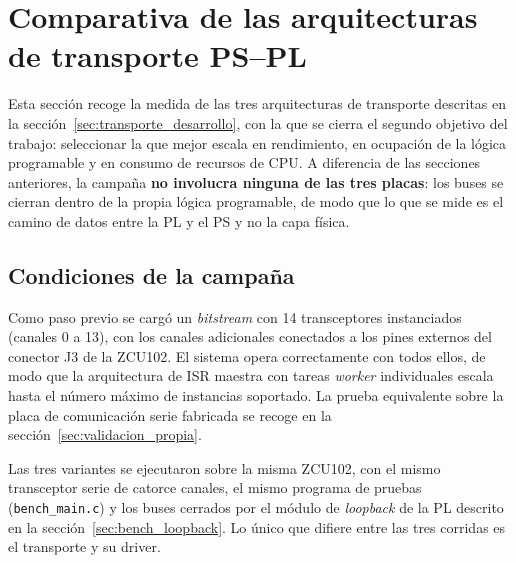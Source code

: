 
\section{Comparativa de las arquitecturas de transporte PS--PL} \label{sec:resultados_benchmark}

Esta sección recoge la medida de las tres arquitecturas de transporte descritas en la
sección~\ref{sec:transporte_desarrollo}, con la que se cierra el segundo objetivo del trabajo:
seleccionar la que mejor escala en rendimiento, en ocupación de la lógica programable y en consumo
de recursos de CPU. A diferencia de las secciones anteriores, la campaña \textbf{no involucra
ninguna de las tres placas}: los buses se cierran dentro de la propia lógica programable, de modo
que lo que se mide es el camino de datos entre la PL y el PS y no la capa física.

\subsection{Condiciones de la campaña}

Como paso previo se cargó un \textit{bitstream} con 14 transceptores instanciados (canales 0 a 13),
con los canales adicionales conectados a los pines externos del conector J3 de la ZCU102. El sistema
opera correctamente con todos ellos, de modo que la arquitectura de ISR maestra con tareas
\textit{worker} individuales escala hasta el número máximo de instancias soportado. La prueba
equivalente sobre la placa de comunicación serie fabricada se recoge en la
sección~\ref{sec:validacion_propia}.

Las tres variantes se ejecutaron sobre la misma ZCU102, con el
mismo transceptor serie de catorce canales, el mismo programa de pruebas
(\texttt{bench\_main.c}) y los buses cerrados por el módulo de \textit{loopback} de la PL
descrito en la sección~\ref{sec:bench_loopback}. Lo único que difiere entre las tres corridas es
el transporte y su driver.

